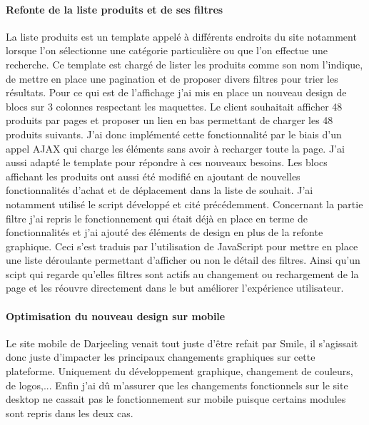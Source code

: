 \documentclass[a4paper,11pt,twoside]{report}
\begin{document}
	\paragraph*{Refonte de la liste produits et de ses filtres}
	La liste produits est un template appelé à différents endroits du site notamment lorsque l'on sélectionne une catégorie particulière ou que l'on effectue une recherche. Ce template est chargé de lister les produits comme son nom l'indique, de mettre en place une pagination et de proposer divers filtres pour trier les résultats. Pour ce qui est de l'affichage j'ai mis en place un nouveau design de blocs sur 3 colonnes respectant les maquettes. Le client souhaitait afficher 48 produits par pages et proposer un lien en bas permettant de charger les 48 produits suivants. J'ai donc implémenté cette fonctionnalité par le biais d'un appel AJAX qui charge les éléments sans avoir à recharger toute la page. J'ai aussi adapté le template pour répondre à ces nouveaux besoins. Les blocs affichant les produits ont aussi été modifié en ajoutant de nouvelles fonctionnalités d'achat et de déplacement dans la liste de souhait. J'ai notamment utilisé le script développé et cité précédemment. Concernant la partie filtre j'ai repris le fonctionnement qui était déjà en place en terme de fonctionnalités et j'ai ajouté des éléments de design en plus de la refonte graphique. Ceci s'est traduis par l'utilisation de JavaScript pour mettre en place une liste déroulante permettant d'afficher ou non le détail des filtres. Ainsi qu'un scipt qui regarde qu'elles filtres sont actifs au changement ou rechargement de la page et les réouvre directement dans le but améliorer l'expérience utilisateur. 
	
	\paragraph*{Optimisation du nouveau design sur mobile}
	Le site mobile de Darjeeling venait tout juste d'être refait par Smile, il s'agissait donc juste d'impacter les principaux changements graphiques sur cette plateforme. Uniquement du développement graphique, changement de couleurs, de logos,... Enfin j'ai dû m'assurer que les changements fonctionnels sur le site desktop ne cassait pas le fonctionnement sur mobile puisque certains modules sont repris dans les deux cas. 
\end{document}
